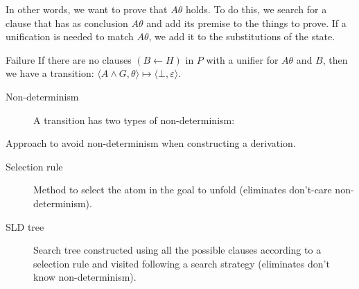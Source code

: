 \begin{description}
\begin{descriptionlist}
                In other words, we want to prove that $A\theta$ holds. 
                To do this, we search for a clause that has as conclusion $A\theta$ and add its premise to the things to prove.
                If a unification is needed to match $A\theta$, we add it to the substitutions of the state.
            \item[Failure] 
                If there are no clauses $(B \leftarrow H)$ in $P$ with a unifier for $A\theta$ and $B$,
                then we have a transition: $\langle A \land G, \theta \rangle \mapsto \langle \bot, \varepsilon \rangle$.
        \end{descriptionlist}

        \begin{description}
            \item[Non-determinism] A transition has two types of non-determinism:
        \end{description}

    \item[Selective linear definite resolution] 
        Approach to avoid non-determinism when constructing a derivation.
        \begin{description}
            \item[Selection rule] 
                Method to select the atom in the goal to unfold (eliminates don't-care non-determinism).
            \item[SLD tree] 
                Search tree constructed using all the possible clauses according to a selection rule
                and visited following a search strategy (eliminates don't know non-determinism).
        \end{description}


\end{description}
